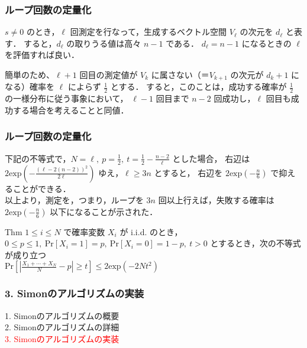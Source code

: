 \documentclass[dvipdfmx,12pt]{beamer}%
\begin{document}
\begin{frame}

\frametitle{ループ回数の定量化}
                          
$s \neq 0$ のとき，$\ell$ 回測定を行なって，生成するベクトル空間 $ V_{\ell} $ の次元を $d_{\ell}$ と表す．
すると，$d_{\ell}$ の取りうる値は高々 $n - 1$ である．
$ d_{\ell} = n - 1 $ になるときの $\ell$ を評価すれば良い．\\

\vspace{10pt}

簡単のため、$ \ell + 1 $ 回目の測定値が $ V_k $ に属さない（＝$ V_{k + 1} $ の次元が $d_k + 1$ になる）確率を
$\ell$ によらず $ \frac{1}{2} $ とする．
すると，このことは，成功する確率が $ \frac{1}{2} $ の一様分布に従う事象において，
$ \ell - 1 $ 回目まで $ n - 2 $ 回成功し，$ \ell $ 回目も成功する場合を考えることと同値．

\end{frame}


\begin{frame}

\frametitle{ループ回数の定量化}
                                  
下記の不等式で，$ N = \ell, \ p = \frac{1}{2}, \ t = \frac{1}{2} - \frac{n - 2}{\ell} $ とした場合，
右辺は $ \displaystyle 2 \mathrm{exp} \left( - \frac{(\ell - 2(n - 2))^2}{2 \ell} \right) $ ゆえ，$ \ell \geq 3n $ とすると，
右辺を $ \displaystyle 2 \mathrm{exp} \left(- \frac{n}{6} \right) $ で抑えることができる．\\
以上より，測定を，つまり，ループを $ 3n $ 回以上行えば，失敗する確率は $ \displaystyle 2 \mathrm{exp} (- \frac{n}{6} ) $ 
以下になることが示された．
    
\vspace{10pt}

\begin{itembox}[l]{Thm}
   $ 1 \leq i \leq N $ で確率変数 $X_i$ が i.i.d. のとき，
   $ 0 \leq p \leq 1, \ \mathrm{Pr}[X_i = 1] = p, \ \mathrm{Pr}[X_i = 0] = 1 - p, \ t > 0 $ とするとき，次の不等式が成り立つ \\
   $ \displaystyle \mathrm{Pr} \left[ \left| \frac{X_1 + \cdots + X_N}{N} - p \right| \geq t \right] \leq 2 \mathrm{exp}(-2 N t^2) $
\end{itembox} 
            
\end{frame}


\begin{frame}

\frametitle{3. Simonのアルゴリズムの実装}
          
1. Simonのアルゴリズムの概要 \\
2. Simonのアルゴリズムの詳細 \\
\textcolor{red}{3. Simonのアルゴリズムの実装}
              
\end{frame}
\end{document}
